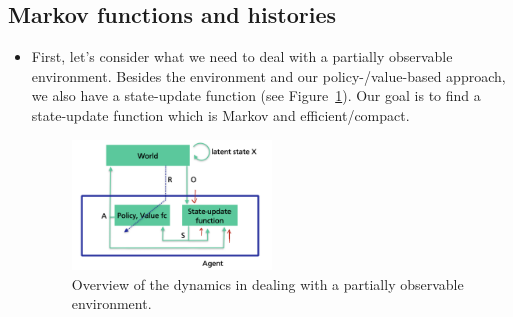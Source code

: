 \subsection{Markov functions and histories}
\begin{itemize}
	\item First, let's consider what we need to deal with a partially observable environment. Besides the environment and our policy-/value-based approach, we also have a state-update function (see Figure~\ref{fig:rl_partially_observability_architecture}). Our goal is to find a state-update function which is Markov and efficient/compact.
	
	\begin{figure}[ht!]
		\centering
		\includegraphics[width=0.5\textwidth]{figures/rl_partially_observability_architecture.png}
		\caption{Overview of the dynamics in dealing with a partially observable environment.}
		\label{fig:rl_partially_observability_architecture}
	\end{figure}
\end{itemize}
